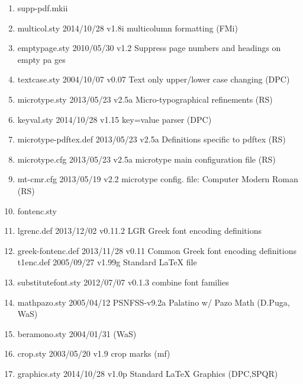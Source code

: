 \begin{enumerate}
\item supp-pdf.mkii
\item multicol.sty 2014/10/28 v1.8i multicolumn formatting (FMi)
\item emptypage.sty 2010/05/30 v1.2 Suppress page numbers and headings on empty pa
ges
\item textcase.sty 2004/10/07 v0.07 Text only upper/lower case changing (DPC)
\item 	microtype.sty 2013/05/23 v2.5a Micro-typographical refinements (RS)
\item 	keyval.sty 2014/10/28 v1.15 key=value parser (DPC)
\item 	microtype-pdftex.def 2013/05/23 v2.5a Definitions specific to pdftex (RS)
\item 	microtype.cfg 2013/05/23 v2.5a microtype main configuration file (RS)
\item 	mt-cmr.cfg 2013/05/19 v2.2 microtype config. file: Computer Modern Roman (RS)
\item fontenc.sty
\item lgrenc.def 2013/12/02 v0.11.2 LGR Greek font encoding definitions
\item greek-fontenc.def 2013/11/28 v0.11 Common Greek font encoding definitions
t1enc.def 2005/09/27 v1.99g Standard LaTeX file
\item substitutefont.sty 2012/07/07 v0.1.3 combine font families
\item mathpazo.sty 2005/04/12 PSNFSS-v9.2a Palatino w/ Pazo Math (D.Puga, WaS) 
\item beramono.sty 2004/01/31 (WaS)
\item crop.sty 2003/05/20 v1.9 crop marks (mf)
\item graphics.sty 2014/10/28 v1.0p Standard LaTeX Graphics (DPC,SPQR)

\end{enumerate}

